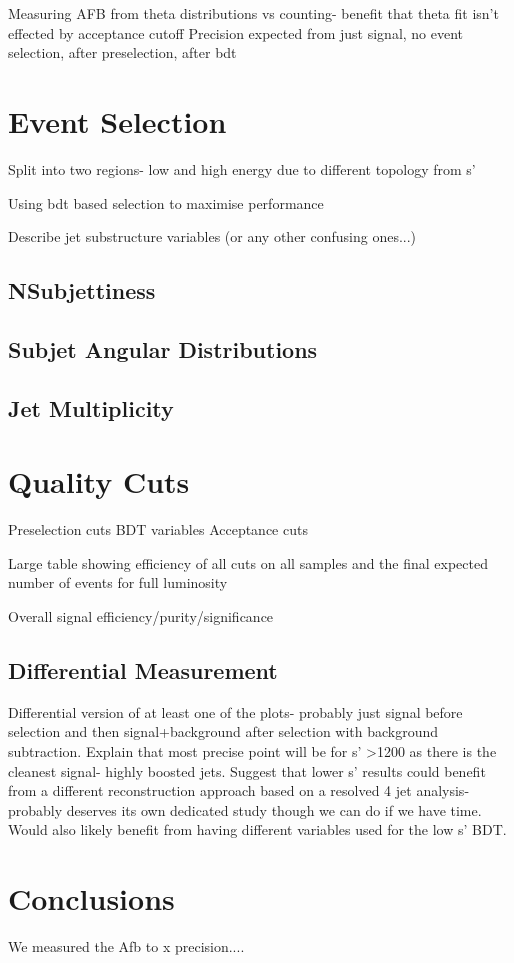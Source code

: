 Measuring AFB from theta distributions vs counting- benefit that theta fit isn't effected by acceptance cutoff
Precision expected from just signal, no event selection, after preselection, after bdt

\section{Event Selection}
\label{Event Selection}


Split into two regions- low and high energy due to different topology from s'

Using bdt based selection to maximise performance

Describe jet substructure variables (or any other confusing ones...)

\subsection{NSubjettiness}
\subsection{Subjet Angular Distributions}
\subsection{Jet Multiplicity}
\label{Jet Multiplicity}

\section{Quality Cuts}
\label{Quality Cuts}
Preselection cuts
BDT variables
Acceptance cuts

Large table showing efficiency of all cuts on all samples and the final expected number of events for full luminosity

Overall signal efficiency/purity/significance

\subsection{Differential Measurement}
Differential version of at least one of the plots- probably just signal before selection and then signal+background after selection with background subtraction.
Explain that most precise point will be for s' >1200 as there is the cleanest signal- highly boosted jets.
Suggest that lower s' results could benefit from a different reconstruction approach based on a resolved 4 jet analysis- probably deserves its own dedicated study though we can do if we have time. Would also likely benefit from having different variables used for the low s' BDT.


\section{Conclusions}

We measured the Afb to x precision....

